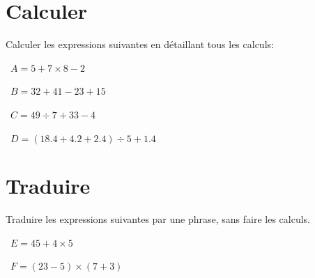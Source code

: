 	
	\section{Calculer}
	Calculer les expressions suivantes en détaillant tous les calculs:
	\begin{questions}
		
	
		\question[3]  $A = 5 + 7 \times 8 - 2$
		
		\fillwithdottedlines{6cm}
			 
		\question[3]  $B = 32 + 41 - 23 + 15$
		
		\fillwithdottedlines{6cm}
		
			\newpage
		
		
		
	
		
		\question[4]  $C = 49 \div 7 + 33 - 4$
		
		\fillwithdottedlines{5.5cm}
		
		\question[4]  $D = (\num{18.4} + \num{4.2} + \num{2.4}) \div 5 + \num{1.4}$
		
		\fillwithdottedlines{5.5cm}
		
	\end{questions}


	\section{Traduire}
	Traduire les expressions suivantes par une phrase, sans faire les calculs.
	\begin{questions}
	
	\question[3]  $E = 45 + 4 \times 5$
	\fillwithdottedlines{3cm}
	
	
	\question[3]  $F = (23 - 5) \times (7 + 3)$
	\fillwithdottedlines{3cm}
	
	\end{questions}